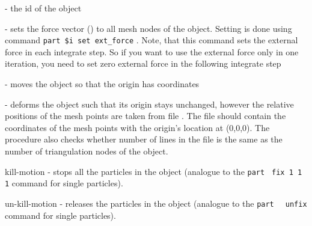 \begin{arguments}
\item[\var{oid}] - the id of the object
\item[\opt{force \var{x} \var{y} \var{z}}] - sets the force vector () to all mesh nodes of the object. Setting is done using \es command \verb|part $i set ext_force|   . Note, that this command sets the external force in each integrate step. So if you want to use the external force only in one iteration, you need to set zero external force in the following integrate step
\item[\opt{origin \var{x} \var{y} \var{z}}] - moves the object so that the origin has coordinates 
\item[\opt{mesh-nodes \var{mesh\_nodes.dat}}] - deforms the object such that its origin stays unchanged, however the relative positions of the mesh points are taken from file . The file  should contain the coordinates of the mesh points with the origin's location at (0,0,0). The procedure also checks whether number of lines in the  file is the same as the number of triangulation nodes of the object.
\item[kill-motion] - stops all the particles in the object (analogue to the \verb|part |  \verb|fix 1 1 1| command for single particles).
\item[un-kill-motion] - releases the particles in the object (analogue to the \verb|part |  \verb| unfix| command for single particles).
\end{arguments} 


